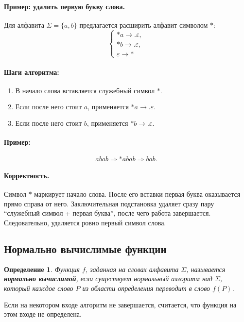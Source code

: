 \documentclass[12pt,a4paper]{article}
\newtheorem{definition}{Определение}
\begin{document}
\paragraph{Пример: удалить первую букву слова.}
Для алфавита $\Sigma=\{a,b\}$ предлагается расширить алфавит символом $*$:
\[
\left\{
\begin{array}{l}
*a \to. \varepsilon,\\
*b \to. \varepsilon,\\
\varepsilon \to *
\end{array}
\right.
\]

\paragraph{Шаги алгоритма:}
\begin{enumerate}
    \item В начало слова вставляется служебный символ $*$.
    \item Если после него стоит $a$, применяется $*a\to.\varepsilon$.
    \item Если после него стоит $b$, применяется $*b\to.\varepsilon$.
\end{enumerate}

\paragraph{Пример:}
\[
abab \Rightarrow *abab \Rightarrow bab.
\]

\paragraph{Корректность.}
Символ $*$ маркирует начало слова. После его вставки первая буква оказывается прямо справа от него. Заключительная подстановка удаляет сразу пару ``служебный символ + первая буква'', после чего работа завершается. Следовательно, удаляется ровно первый символ слова.

\subsection{Нормально вычислимые функции}
\begin{definition}
Функция $f$, заданная на словах алфавита $\Sigma$, называется \textbf{нормально вычислимой}, если существует нормальный алгоритм над $\Sigma$, который каждое слово $P$ из области определения переводит в слово $f(P)$.
\end{definition}

Если на некотором входе алгоритм не завершается, считается, что функция на этом входе не определена.
\end{document}
